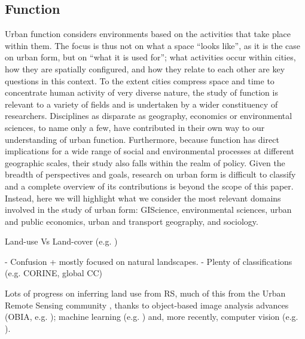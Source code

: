 \subsection{Function}
\label{sec:lit_function}


Urban function considers environments based on the activities that take place
within them.
%
The focus is thus not on what a space ``looks
like'', as it is the case on urban form, but on ``what it is used for''; what
activities occur within cities, how they are spatially configured, and how
they relate to each other are key questions in this context.
%
To the extent cities compress space and time to concentrate human activity of
very diverse nature, the study of function is relevant to a variety of
fields and is undertaken by a wider constituency of researchers. Disciplines
as disparate as geography, economics or environmental sciences, to name only a
few, have contributed in their own way to our understanding of urban
function.
Furthermore, because function has direct implications for a wide range of
social and environmental processes at different geographic scales, their study
also falls within the realm of policy.
%
Given the breadth of perspectives and goals, research on urban form is
difficult to classify and a complete overview of its contributions is beyond
the scope of this paper. Instead, here we will highlight what we consider the
most relevant domains involved in the study of urban form: GIScience,
environmental sciences, urban and public economics, urban and transport
geography, and sociology.


Land-use Vs Land-cover (e.g. \citealp{fisher2005land, doi:10.1080/17474230802434187})

- Confusion + mostly focused on natural landscapes.
- Plenty of classifications (e.g. CORINE, global CC)

Lots of progress on inferring land use from RS, much of this from the Urban
Remote Sensing community \citep{weng2018urban}, thanks to object-based image
analysis advances (OBIA, e.g. \citealp{prasad2015remotely}); machine
learning (e.g. \citealp{kuffer2016slums, georganos2018very, JOCHEM2018104})
and, more recently, computer vision (e.g. \citealp{stark2020satellite, geiss2020deep}).



